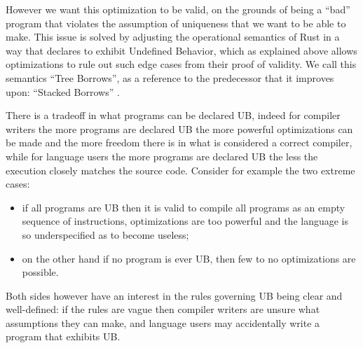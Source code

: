 \documentclass[a4paper,11pt]{article}
\theoremstyle{plain}
\theoremstyle{definition}
\theoremstyle{remark}
\newcommand{\tcode}[1]{\rstinline{#1}}
\begin{document}
However we want this optimization to be valid, on the grounds of \tcode{context1}
being a ``bad'' program that violates the assumption of uniqueness that we want to be able
to make. This issue is solved by adjusting the operational semantics of Rust
in a way that declares \tcode{context1} to exhibit Undefined Behavior, which as
explained above allows optimizations to rule out such edge cases from their proof
of validity. We call this semantics ``Tree Borrows'', as a reference to the
predecessor that it improves upon: ``Stacked Borrows'' \cite{stacked_borrows}.

There is a tradeoff in what programs can be declared UB, indeed for compiler writers
the more programs are declared UB the more powerful optimizations can be made and
the more freedom there is in what is considered a correct compiler, while for language
users the more programs are declared UB the less the execution closely matches the source
code. Consider for example the two extreme cases:
\begin{itemize}
    \item if all programs are UB then it is valid to compile all programs as an
        empty sequence of instructions, optimizations are too powerful and the language
        is so underspecified as to become useless;
    \item on the other hand if no program is ever UB, then few to no optimizations are possible.
\end{itemize}
Both sides however have an interest in the rules governing UB being clear and well-defined:
if the rules are vague then compiler writers are unsure what assumptions they can make,
and language users may accidentally write a program that exhibits UB.
\end{document}
